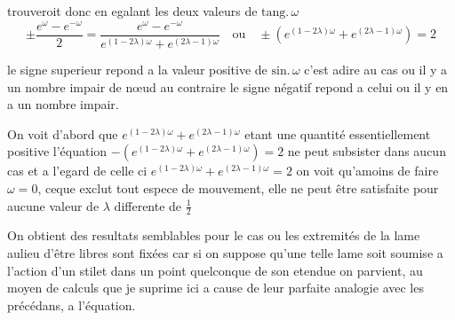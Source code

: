 \documentclass[11pt,a4paper]{article}
\begin{document}
\marginal{*}
trouveroit donc en egalant les deux valeurs de $\text{tang.}\,\omega$
\[ \pm\frac{e^{\omega}-e^{-\omega}}{2}=\frac{e^{\omega}-e^{-\omega}}{e^{(1-2\lambda)\omega}+e^{(2\lambda-1)\omega}} \quad\text{ou}\quad \pm(e^{(1-2\lambda)\omega}+e^{(2\lambda-1)\omega})=2 \]

le signe superieur repond a la valeur positive de $\text{sin.}\,\omega$
c'est adire au cas ou il y a un nombre impair de nœud au contraire le signe
négatif repond a celui ou il y en a un nombre impair.

On voit d'abord que $e^{(1-2\lambda)\omega}+e^{(2\lambda-1)\omega}$ etant une
quantité essentiellement positive l'équation
$-(e^{(1-2\lambda)\omega}+e^{(2\lambda-1)\omega})=2$ ne peut subsister dans
aucun cas et a l'egard de celle ci
$e^{(1-2\lambda)\omega}+e^{(2\lambda-1)\omega}=2$ on voit qu'amoins de faire
$\omega=0$, ceque exclut tout espece de mouvement, elle ne peut être
satisfaite pour aucune valeur de $\lambda$ differente de $\frac{1}{2}$

On obtient des resultats semblables pour le cas ou les extremités de la lame
aulieu d'être libres sont fixées car si on suppose qu'une telle lame soit
soumise a l'action d'un stilet dans un point quelconque de son etendue on
parvient, au moyen de calculs que je suprime ici a cause de leur parfaite
analogie avec les précédans, a l'équation.
\end{document}
